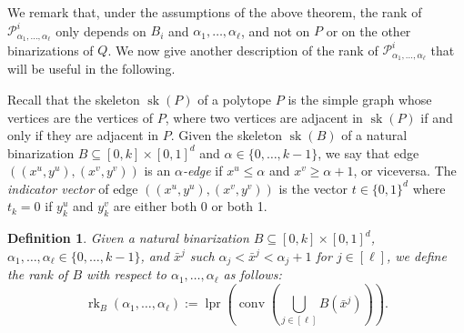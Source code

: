\documentclass[11pt,a4paper]{article}
\newtheorem{definition}[theorem]{Definition}
\newcommand{\calP}{\mathcal{P}}
\newcommand{\conv}{\operatorname{conv}}
\newcommand{\1}{\textbf{1}}
\newcommand{\rk}{\operatorname{rk}}
\newcommand{\lpr}{\operatorname{lpr}}
\newcommand{\sk}{\operatorname{sk}}
\newcommand\manuel[1]{\textcolor{LimeGreen}{\textbf{ MA:  #1}}}
\begin{document}








We remark that, under the assumptions of the above theorem, the rank of $\mathcal{P}^i_{\alpha_1,\dots,\alpha_{\ell}}$ only depends on $B_i$ and $\alpha_1,\dots, \alpha_\ell$, and not on $P$ or on the other binarizations of $Q$. We now give another description of the rank of $\mathcal{P}^i_{\alpha_1,\dots,\alpha_{\ell}}$ that will be useful in the following.

 Recall that the skeleton $\sk(P)$ of a polytope $P$ is the simple graph whose vertices are the vertices of $P$, where two vertices are adjacent in $\sk(P)$ if and only if they are adjacent  in $P$. 
 Given the skeleton $\sk(B)$ of a  natural binarization $B\subseteq [0,k]\times [0,1]^d$ and $\alpha\in \{0,\dots,k-1\}$, we say that edge $((x^u,y^u),(x^v,y^v))$ is an {\em $\alpha$-edge} if $x^u\le \alpha$ and $x^v\ge \alpha+1$, or viceversa.
 The {\em indicator vector} of edge $((x^u,y^u),(x^v,y^v))$ is the  vector  $t\in \{0,1\}^d$  where $t_k=0$ if $y^u_k$ and $y^v_k$ are either both 0 or both 1.
 



\begin{definition}\label{def:rankB}
  Given a natural binarization $B\subseteq [0,k]\times [0,1]^d$,   $\alpha_1,\dots,\alpha_\ell\in \{0,\dots,k-1\}$, and   $\bar{x}^j$  such $\alpha_j<\bar{x}^j<\alpha_j+1$ for $j\in[\ell]$, we define the {\em rank} of $B$ with respect to $\alpha_1,\dots,\alpha_\ell$ as follows:
  $$\rk_B(\alpha_1,\dots,\alpha_\ell):=\lpr(\conv(\textstyle\bigcup_{j\in [\ell]} B(\bar{x}^j))).$$
\end{definition}
\end{document}
